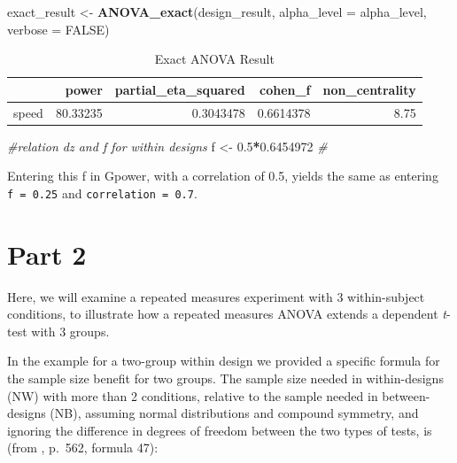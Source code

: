 \documentclass[]{book}
\newenvironment{Shaded}{\begin{snugshade}}{\end{snugshade}}
\newcommand{\CommentTok}[1]{\textcolor[rgb]{0.56,0.35,0.01}{\textit{#1}}}
\newcommand{\DataTypeTok}[1]{\textcolor[rgb]{0.13,0.29,0.53}{#1}}
\newcommand{\FloatTok}[1]{\textcolor[rgb]{0.00,0.00,0.81}{#1}}
\newcommand{\KeywordTok}[1]{\textcolor[rgb]{0.13,0.29,0.53}{\textbf{#1}}}
\newcommand{\NormalTok}[1]{#1}
\newcommand{\OperatorTok}[1]{\textcolor[rgb]{0.81,0.36,0.00}{\textbf{#1}}}
\newcommand{\OtherTok}[1]{\textcolor[rgb]{0.56,0.35,0.01}{#1}}
\newcommand{\StringTok}[1]{\textcolor[rgb]{0.31,0.60,0.02}{#1}}
\begin{document}
\begin{Shaded}
\begin{Highlighting}[]
\NormalTok{exact_result <-}\StringTok{ }\KeywordTok{ANOVA_exact}\NormalTok{(design_result,}
                            \DataTypeTok{alpha_level =}\NormalTok{ alpha_level,}
                            \DataTypeTok{verbose =} \OtherTok{FALSE}\NormalTok{)}
\end{Highlighting}
\end{Shaded}

\begin{table}[!h]

\caption{\label{tab:unnamed-chunk-105}Exact ANOVA Result}
\centering
\begin{tabular}{l|r|r|r|r}
\hline
  & power & partial\_eta\_squared & cohen\_f & non\_centrality\\
\hline
speed & 80.33235 & 0.3043478 & 0.6614378 & 8.75\\
\hline
\end{tabular}
\end{table}

\begin{Shaded}
\begin{Highlighting}[]
\CommentTok{#relation dz and f for within designs }
\NormalTok{f <-}\StringTok{ }\FloatTok{0.5}\OperatorTok{*}\FloatTok{0.6454972}
\CommentTok{#  }
\end{Highlighting}
\end{Shaded}

Entering this f in Gpower, with a correlation of 0.5, yields the same as entering \texttt{f\ =\ 0.25} and \texttt{correlation\ =\ 0.7}.

\hypertarget{part-2-1}{%
\section{Part 2}\label{part-2-1}}

Here, we will examine a repeated measures experiment with 3 within-subject conditions, to illustrate how a repeated measures ANOVA extends a dependent \emph{t}-test with 3 groups.

In the example for a two-group within design we provided a specific formula for the sample size benefit for two groups. The sample size needed in within-designs (NW) with more than 2 conditions, relative to the sample needed in between-designs (NB), assuming normal distributions and compound symmetry, and ignoring the difference in degrees of freedom between the two types of tests, is (from \citet{maxwell_designing_2004}, p.~562, formula 47):
\end{document}
